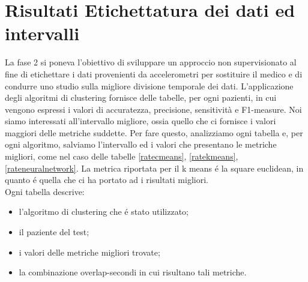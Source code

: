 \section{Risultati Etichettatura dei dati ed intervalli}
La fase 2 si poneva l'obiettivo di sviluppare un approccio non supervisionato al fine di etichettare i dati provenienti da accelerometri per sostituire il medico e di condurre uno studio sulla migliore divisione temporale dei dati. L'applicazione degli algoritmi di clustering fornisce delle tabelle, per ogni pazienti, in cui vengono espressi i valori di accuratezza, precisione, sensitività e F1-measure. Noi siamo interessati all'intervallo migliore, ossia quello che ci fornisce i valori maggiori delle metriche suddette. Per fare questo, analizziamo ogni tabella e, per ogni algoritmo, salviamo l'intervallo ed i valori che presentano le metriche migliori, come nel caso delle tabelle \ref{ratecmeans}, \ref{ratekmeans}, \ref{rateneuralnetwork}. La metrica riportata per il k means é la square euclidean, in quanto é quella che ci ha portato ad i risultati migliori. \\
Ogni tabella descrive:
\begin{itemize}
	\item l'algoritmo di clustering che é stato utilizzato;
	\item il paziente del test;
	\item i valori delle metriche migliori trovate;
	\item la combinazione overlap-secondi in cui risultano tali metriche.
\end{itemize}

